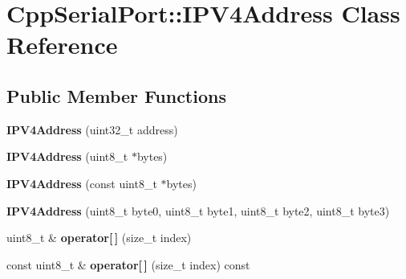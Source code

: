 \hypertarget{class_cpp_serial_port_1_1_i_p_v4_address}{}\section{Cpp\+Serial\+Port\+:\+:I\+P\+V4\+Address Class Reference}
\label{class_cpp_serial_port_1_1_i_p_v4_address}
\subsection*{Public Member Functions}
\begin{DoxyCompactItemize}
\item 
\mbox{\label{class_cpp_serial_port_1_1_i_p_v4_address_aca670bf2187bad7617f611dc0e1f111f}} 
{\bfseries I\+P\+V4\+Address} (uint32\+\_\+t address)
\item 
\mbox{\label{class_cpp_serial_port_1_1_i_p_v4_address_afaf6fc9748451e32cfd6414f38af98c2}} 
{\bfseries I\+P\+V4\+Address} (uint8\+\_\+t $\ast$bytes)
\item 
\mbox{\label{class_cpp_serial_port_1_1_i_p_v4_address_a44f1afc69207730a48e181bf61a40f40}} 
{\bfseries I\+P\+V4\+Address} (const uint8\+\_\+t $\ast$bytes)
\item 
\mbox{\label{class_cpp_serial_port_1_1_i_p_v4_address_a0d2c74afaa60975d339ebece26cae883}} 
{\bfseries I\+P\+V4\+Address} (uint8\+\_\+t byte0, uint8\+\_\+t byte1, uint8\+\_\+t byte2, uint8\+\_\+t byte3)
\item 
\mbox{\label{class_cpp_serial_port_1_1_i_p_v4_address_a1680c018e692048fb7a5e54c742ad72e}} 
uint8\+\_\+t \& {\bfseries operator\mbox{[}$\,$\mbox{]}} (size\+\_\+t index)
\item 
\mbox{\label{class_cpp_serial_port_1_1_i_p_v4_address_a598b9c9faa71ab44e6d99454f92ab048}} 
const uint8\+\_\+t \& {\bfseries operator\mbox{[}$\,$\mbox{]}} (size\+\_\+t index) const
\item 
\mbox{\label{class_cpp_serial_port_1_1_i_p_v4_address_ab326d8fd9b00adc5066e8087334c49d1}} 

\end{DoxyCompactItemize}
